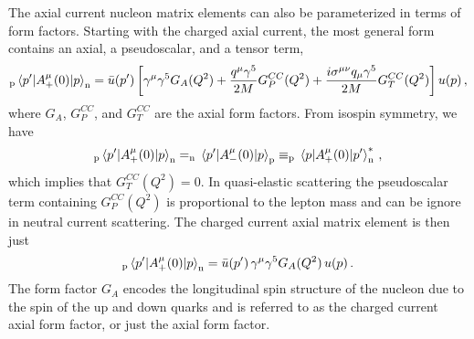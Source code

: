     The axial current nucleon matrix elements can also be parameterized in
    terms of form factors. Starting with the charged axial current, the most
    general form contains an axial, a pseudoscalar, and a tensor
    term,~\cite{Alberico:2001sd}
    \begin{equation}
      _{\textrm{p}}\mel{p'}{A^{\mu}_+(0)}{p}_{\textrm{n}} 
        = \bar{u}(p') \left[\gamma^{\mu}\gamma^{5} G_A(Q^2) 
          + \frac{q^{\mu}\gamma^{5}}{2M}G_P^{CC}(Q^2) 
          + \frac{i\sigma^{\mu\nu}q_{\mu}\gamma^{5}}{2M}G_T^{CC}(Q^2)\right] u(p) \,,
    \end{equation}
    where $G_A$, $G_P^{CC}$, and $G_T^{CC}$ are the axial form factors.  From
    isospin symmetry, we have
    \begin{equation}
      _{\textrm{p}}\mel{p'}{A^{\mu}_+(0)}{p}_{\textrm{n}} 
      = _{\textrm{n}}\mel{p'}{A^{\mu}_-(0)}{p}_{\textrm{p}} 
      \equiv _{\textrm{p}}\mel{p}{A^{\mu}_+(0)}{p'}_{\textrm{n}}^* \,,
    \end{equation}
    which implies that $G_T^{CC}(Q^2) = 0$. In quasi-elastic scattering the
    pseudoscalar term containing $G_P^{CC}(Q^2)$ is proportional to the lepton
    mass and can be ignore in neutral current scattering. The charged current
    axial matrix element is then just
    \begin{equation}
      _{\textrm{p}}\mel{p'}{A^{\mu}_+(0)}{p}_{\textrm{n}} 
        = \bar{u}(p') \,\gamma^{\mu}\gamma^{5} G_A(Q^2)\, u(p) \,.
    \end{equation}
    The form factor $G_A$ encodes the longitudinal spin structure of the
    nucleon due to the spin of the up and down quarks and is referred to as the
    charged current axial form factor, or just the axial form factor.

